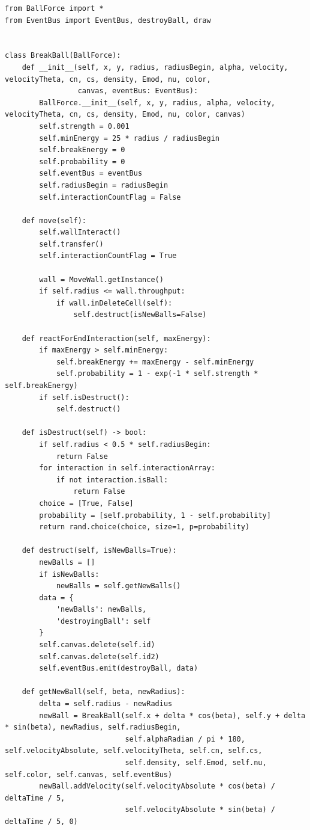 \documentclass[utf8x, 14pt, oneside, a4paper]{article}
\begin{document}
    \begin{lstlisting}
from BallForce import *
from EventBus import EventBus, destroyBall, draw


class BreakBall(BallForce):
    def __init__(self, x, y, radius, radiusBegin, alpha, velocity, velocityTheta, cn, cs, density, Emod, nu, color,
                 canvas, eventBus: EventBus):
        BallForce.__init__(self, x, y, radius, alpha, velocity, velocityTheta, cn, cs, density, Emod, nu, color, canvas)
        self.strength = 0.001
        self.minEnergy = 25 * radius / radiusBegin
        self.breakEnergy = 0
        self.probability = 0
        self.eventBus = eventBus
        self.radiusBegin = radiusBegin
        self.interactionCountFlag = False

    def move(self):
        self.wallInteract()
        self.transfer()
        self.interactionCountFlag = True

        wall = MoveWall.getInstance()
        if self.radius <= wall.throughput:
            if wall.inDeleteCell(self):
                self.destruct(isNewBalls=False)

    def reactForEndInteraction(self, maxEnergy):
        if maxEnergy > self.minEnergy:
            self.breakEnergy += maxEnergy - self.minEnergy
            self.probability = 1 - exp(-1 * self.strength * self.breakEnergy)
        if self.isDestruct():
            self.destruct()

    def isDestruct(self) -> bool:
        if self.radius < 0.5 * self.radiusBegin:
            return False
        for interaction in self.interactionArray:
            if not interaction.isBall:
                return False
        choice = [True, False]
        probability = [self.probability, 1 - self.probability]
        return rand.choice(choice, size=1, p=probability)

    def destruct(self, isNewBalls=True):
        newBalls = []
        if isNewBalls:
            newBalls = self.getNewBalls()
        data = {
            'newBalls': newBalls,
            'destroyingBall': self
        }
        self.canvas.delete(self.id)
        self.canvas.delete(self.id2)
        self.eventBus.emit(destroyBall, data)

    def getNewBall(self, beta, newRadius):
        delta = self.radius - newRadius
        newBall = BreakBall(self.x + delta * cos(beta), self.y + delta * sin(beta), newRadius, self.radiusBegin,
                            self.alphaRadian / pi * 180, self.velocityAbsolute, self.velocityTheta, self.cn, self.cs,
                            self.density, self.Emod, self.nu, self.color, self.canvas, self.eventBus)
        newBall.addVelocity(self.velocityAbsolute * cos(beta) / deltaTime / 5,
                            self.velocityAbsolute * sin(beta) / deltaTime / 5, 0)


\end{lstlisting}
\end{document}
